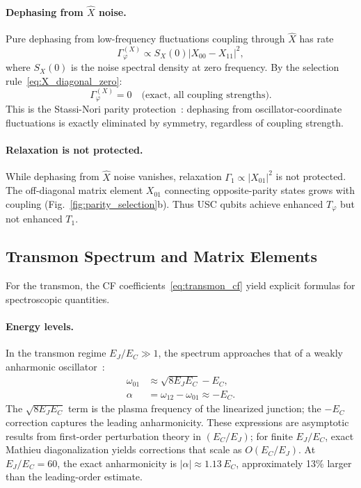 \documentclass[reprint, floatfix, superscriptaddress, amsmath, amssymb, longbibliography]{revtex4-2}
\begin{document}
\paragraph{Dephasing from $\hat{X}$ noise.} Pure dephasing from low-frequency fluctuations coupling through $\hat{X}$ has rate
\begin{equation}
\Gamma_\varphi^{(X)} \propto S_X(0)|X_{00} - X_{11}|^2,
\label{eq:dephasing_X}
\end{equation}
where $S_X(0)$ is the noise spectral density at zero frequency. By the selection rule~\eqref{eq:X_diagonal_zero}:
\begin{equation}
\boxed{\Gamma_\varphi^{(X)} = 0 \quad \text{(exact, all coupling strengths).}}
\label{eq:dephasing_protected}
\end{equation}
This is the Stassi-Nori parity protection~\cite{Stassi2018}: dephasing from oscillator-coordinate fluctuations is exactly eliminated by symmetry, regardless of coupling strength.

\paragraph{Relaxation is not protected.} While dephasing from $\hat{X}$ noise vanishes, relaxation $\Gamma_1 \propto |X_{01}|^2$ is not protected. The off-diagonal matrix element $X_{01}$ connecting opposite-parity states grows with coupling (Fig.~\ref{fig:parity_selection}b). Thus USC qubits achieve enhanced $T_\varphi$ but not enhanced $T_1$.

\subsection{Transmon Spectrum and Matrix Elements}
\label{sec:transmon_observables}
For the transmon, the CF coefficients~\eqref{eq:transmon_cf} yield explicit formulas for spectroscopic quantities.

\paragraph{Energy levels.} In the transmon regime $E_J/E_C \gg 1$, the spectrum approaches that of a weakly anharmonic oscillator~\cite{Koch2007}:
\begin{align}
\omega_{01} &\approx \sqrt{8E_J E_C} - E_C, \label{eq:omega01} \\
\alpha &= \omega_{12} - \omega_{01} \approx -E_C. \label{eq:anharmonicity}
\end{align}
The $\sqrt{8E_JE_C}$ term is the plasma frequency of the linearized junction; the $-E_C$ correction captures the leading anharmonicity. These expressions are asymptotic results from first-order perturbation theory in $(E_C/E_J)$; for finite $E_J/E_C$, exact Mathieu diagonalization yields corrections that scale as $O(E_C/E_J)$. At $E_J/E_C = 60$, the exact anharmonicity is $|\alpha| \approx 1.13\,E_C$, approximately 13\% larger than the leading-order estimate.
\end{document}
